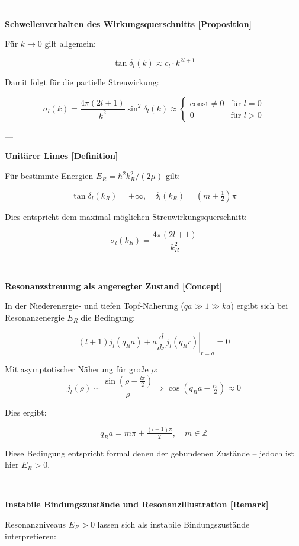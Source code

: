 \documentclass[10pt, letterpaper]{article}
\begin{document}
---

\textbf{Schwellenverhalten des Wirkungsquerschnitts [Proposition]}

Für $k \to 0$ gilt allgemein:

\[
\tan \delta_l(k) \approx c_l \cdot k^{2l+1}
\]

Damit folgt für die partielle Streuwirkung:

\[
\sigma_l(k) = \frac{4\pi(2l+1)}{k^2} \sin^2 \delta_l(k) \approx
\begin{cases}
\text{const} \neq 0 & \text{für } l = 0 \\
0 & \text{für } l > 0
\end{cases}
\]

---

\textbf{Unitärer Limes [Definition]}

Für bestimmte Energien $E_R = \hbar^2 k_R^2 / (2\mu)$ gilt:

\[
\tan \delta_l(k_R) = \pm \infty, \quad \delta_l(k_R) = \left( m + \tfrac{1}{2} \right) \pi
\]

Dies entspricht dem maximal möglichen Streuwirkungsquerschnitt:

\[
\sigma_l(k_R) = \frac{4\pi(2l+1)}{k_R^2}
\]

---

\textbf{Resonanzstreuung als angeregter Zustand [Concept]}

In der Niederenergie- und tiefen Topf-Näherung ($qa \gg 1 \gg ka$) ergibt sich bei Resonanzenergie $E_R$ die Bedingung:

\[
(l+1) j_l(q_R a) + a \left. \frac{d}{dr} j_l(q_R r) \right|_{r=a} = 0
\]

Mit asymptotischer Näherung für große $\rho$:
\[
j_l(\rho) \sim \frac{\sin(\rho - \tfrac{l\pi}{2})}{\rho}
\Rightarrow \cos(q_R a - \tfrac{l\pi}{2}) \approx 0
\]

Dies ergibt:

\[
q_R a = m\pi + \tfrac{(l+1)\pi}{2}, \quad m \in \mathbb{Z}
\]

Diese Bedingung entspricht formal denen der gebundenen Zustände – jedoch ist hier $E_R > 0$.

---

\textbf{Instabile Bindungszustände und Resonanzillustration [Remark]}

Resonanzniveaus $E_R > 0$ lassen sich als instabile Bindungszustände interpretieren:
\end{document}
